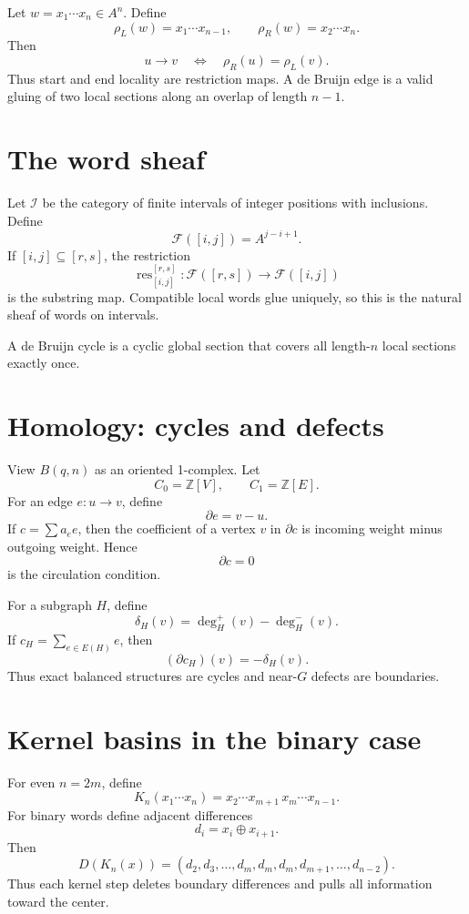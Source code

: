 \documentclass[11pt]{article}
\begin{document}
Let \(w=x_1\cdots x_n\in A^n\). Define
\[
\rho_L(w)=x_1\cdots x_{n-1},\qquad
\rho_R(w)=x_2\cdots x_n.
\]
Then
\[
u\to v \quad\Longleftrightarrow\quad \rho_R(u)=\rho_L(v).
\]
Thus start and end locality are restriction maps. A de Bruijn edge is a valid gluing of two local sections along an overlap of length \(n-1\).

\section{The word sheaf}

Let \(\mathcal I\) be the category of finite intervals of integer positions with inclusions. Define
\[
\mathcal F([i,j])=A^{j-i+1}.
\]
If \([i,j]\subseteq[r,s]\), the restriction
\[
\operatorname{res}^{[r,s]}_{[i,j]}:\mathcal F([r,s])\to \mathcal F([i,j])
\]
is the substring map. Compatible local words glue uniquely, so this is the natural sheaf of words on intervals.

A de Bruijn cycle is a cyclic global section that covers all length-\(n\) local sections exactly once.

\section{Homology: cycles and defects}

View \(B(q,n)\) as an oriented 1-complex. Let
\[
C_0=\mathbb Z[V],\qquad C_1=\mathbb Z[E].
\]
For an edge \(e:u\to v\), define
\[
\partial e=v-u.
\]
If \(c=\sum a_e e\), then the coefficient of a vertex \(v\) in \(\partial c\) is incoming weight minus outgoing weight. Hence
\[
\partial c=0
\]
is the circulation condition.

For a subgraph \(H\), define
\[
\delta_H(v)=\deg_H^+(v)-\deg_H^-(v).
\]
If \(c_H=\sum_{e\in E(H)}e\), then
\[
(\partial c_H)(v)= -\delta_H(v).
\]
Thus exact balanced structures are cycles and near-\(G\) defects are boundaries.

\section{Kernel basins in the binary case}

For even \(n=2m\), define
\[
K_n(x_1\cdots x_n)=x_2\cdots x_{m+1}\,x_m\cdots x_{n-1}.
\]
For binary words define adjacent differences
\[
d_i=x_i\oplus x_{i+1}.
\]
Then
\[
D(K_n(x))=(d_2,d_3,\dots,d_m,d_m,d_m,d_{m+1},\dots,d_{n-2}).
\]
Thus each kernel step deletes boundary differences and pulls all information toward the center.
\end{document}
